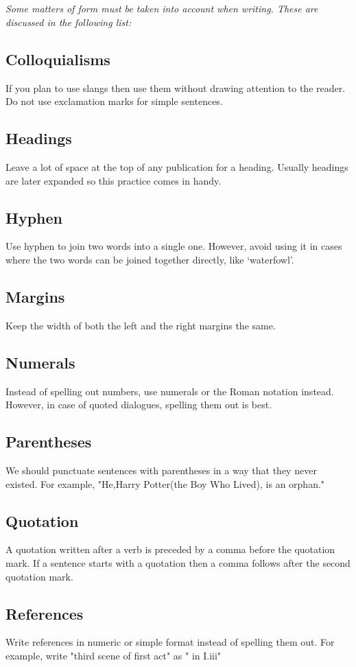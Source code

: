 \documentclass{report}
\begin{document}
\chapter{}
{\itshape
Some matters of form must be taken into account when writing. These are discussed in the following list:
}
\section{Colloquialisms}
If you plan to use slangs then use them without drawing attention to the reader. Do not use exclamation marks for simple sentences.
\section{Headings}
Leave a lot of space at the top of any publication for a heading. Usually headings are later expanded so this practice comes in handy.
\section{Hyphen}
Use hyphen to join two words into a single one. However, avoid using it in cases where the two words can be joined together directly, like `waterfowl'.
\section{Margins}
Keep the width of both the left and the right margins the same.
\section{Numerals}
Instead of spelling out numbers, use numerals or the Roman notation instead. However, in case of quoted dialogues, spelling them out is best.
\section{Parentheses}
We should punctuate sentences with parentheses in a way that they never existed. For example, "He,Harry Potter(the Boy Who Lived), is an orphan."
\section{Quotation}
A quotation written after a verb is preceded by a comma before the quotation mark. If a sentence starts with a quotation then a comma follows after the second quotation mark.
\section{References}
Write references in numeric or simple format instead of spelling them out. For example, write "third scene of first act" as " in I.iii"
\end{document}

